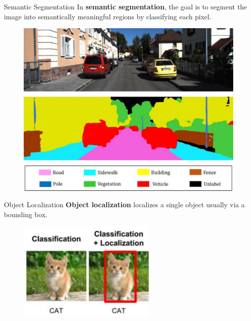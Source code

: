 \begin{frame}[allowframebreaks]

\begin{mydefinitionblock}{8.19}{Semantic Segmentation}
    In \textbf{semantic segmentation}, the goal is to segment the image into semantically meaningful regions by classifying each pixel.

    \begin{figure}[H]
        \centering
        \includegraphics[width=1.0\textwidth]{.././assets/8.20.png}
    \end{figure}
\end{mydefinitionblock}

\end{frame}

\begin{frame}[allowframebreaks]

\begin{mydefinitionblock}{8.20}{Object Localization}
    \textbf{Object localization} localizes a single object usually via a bounding box.

    \begin{figure}[H]
        \centering
        \includegraphics[width=0.6\textwidth]{.././assets/8.21.png}
    \end{figure}
\end{mydefinitionblock}

\end{frame}

